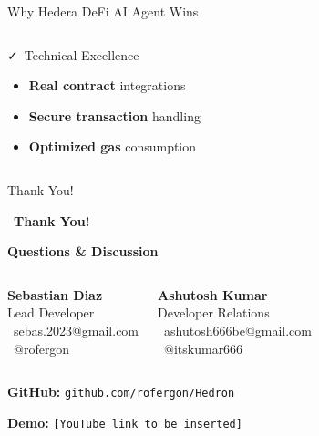\documentclass[aspectratio=169]{beamer}
\providecommand{\faCheckDouble}{\faCheck}
\begin{document}
\begin{frame}{Why Hedera DeFi AI Agent Wins}
\begin{columns}
\begin{block}{\faCheckDouble\ Technical Excellence}
\begin{itemize}
\item \textbf{Real contract} integrations
\item \textbf{Secure transaction} handling
\item \textbf{Optimized gas} consumption
\end{itemize}
\end{block}
\end{columns}
\end{frame}

\begin{frame}{Thank You!}
\begin{center}
\large \faHeart\ \textbf{Thank You!}

\vspace{0.2cm}

\small \textbf{Questions \& Discussion}

\vspace{0.3cm}

\begin{columns}
\hspace{2.5cm}
\textbf{\footnotesize Sebastian Diaz}\\
\vspace{0.05cm}
\footnotesize Lead Developer\\
\vspace{0.05cm}
\footnotesize \faEnvelope\ sebas.2023@gmail.com\\
\footnotesize \faGithub\ @rofergon

\textbf{\footnotesize Ashutosh Kumar}\\
\vspace{0.05cm}
\footnotesize Developer Relations\\
\vspace{0.05cm}
\footnotesize \faEnvelope\ ashutosh666be@gmail.com
\\
\footnotesize \faGithub\ @itskumar666
\end{columns}

\vspace{0.3cm}

\textbf{\footnotesize GitHub:} \hspace{0.2cm} \texttt{\footnotesize github.com/rofergon/Hedron}

\vspace{0.1cm}

\textbf{\footnotesize Demo:} \texttt{\footnotesize [YouTube link to be inserted]}
\end{center}
\end{frame}
\end{document}
